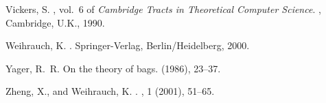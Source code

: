 \documentclass{amsart}
\theoremstyle{definition}
\begin{document}
\begin{thebibliography}{10}
{\sc Vickers, S.}
, vol.~6 of {\em {Cambridge Tracts in
  Theoretical Computer Science}}.
, {Cambridge, U.K.}, 1990.

{\sc Weihrauch, K.}
.
\newblock Springer-Verlag, Berlin/Heidelberg, 2000.

{\sc Yager, R.~R.}
\newblock On the theory of bags.
 (1986), 23--37.

{\sc Zheng, X., and Weihrauch, K.}
.
, 1 (2001), 51--65.

\end{thebibliography}
\end{document}

